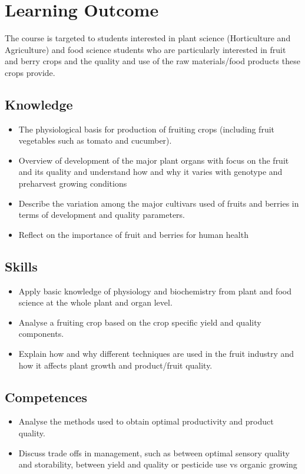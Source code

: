 \section*{Learning Outcome}
The course is targeted to students interested in plant science (Horticulture and Agriculture) and food science students who are particularly interested in fruit and berry crops and the quality and use of the raw materials/food products these crops provide.
\subsection*{Knowledge}

\begin{itemize}
    \item The physiological basis for production of fruiting crops (including fruit vegetables such as tomato and cucumber).
    \item Overview of development of the major plant organs with focus on the fruit and its quality and understand how and why it varies with genotype and preharvest growing conditions
    \item Describe the variation among the major cultivars used of fruits and berries in terms of development and quality parameters.
    \item Reflect on the importance of fruit and berries for human health
\end{itemize}

\subsection*{Skills}

\begin{itemize}
    \item Apply basic knowledge of physiology and biochemistry from plant and food science at the whole plant and organ level.
    \item Analyse a fruiting crop based on the crop specific yield and quality components.
    \item Explain how and why different techniques are used in the fruit industry and how it affects plant growth and product/fruit quality.
\end{itemize}

\subsection*{Competences}

\begin{itemize}
    \item Analyse the methods used to obtain optimal productivity and product quality.
    \item Discuss trade offs in management, such as between optimal sensory quality and storability, between yield and quality or pesticide use vs organic growing
\end{itemize}



